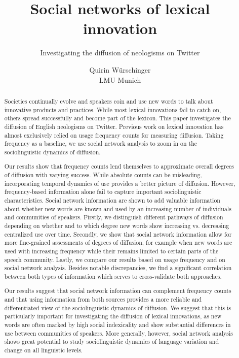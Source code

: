 \documentclass[draft, a4paper, abstract=on]{scrartcl}
\begin{document}

  \title{Social networks of lexical innovation}
  \subtitle{Investigating the diffusion of neologisms on Twitter}
  \author{Quirin Würschinger\\ LMU Munich}
  \maketitle


  \cleardoublepage

  \begin{abstract}

    Societies continually evolve and speakers coin and use new words to talk about innovative products and practices. While most lexical innovations fail to catch on, others spread successfully and become part of the lexicon. This paper investigates the diffusion of English neologisms on Twitter. Previous work on lexical innovation has almost exclusively relied on usage frequency counts for measuring diffusion. Taking frequency as a baseline, we use social network analysis to zoom in on the sociolinguistic dynamics of diffusion.

    Our results show that frequency counts lend themselves to approximate overall degrees of diffusion with varying success. While absolute counts can be misleading, incorporating temporal dynamics of use provides a better picture of diffusion. However, frequency-based information alone fail to capture important sociolinguistic characteristics. Social network information are shown to add valuable information about whether new words are known and used by an increasing number of individuals and communities of speakers. Firstly, we distinguish different pathways of diffusion depending on whether and to which degree new words show increasing vs. decreasing centralized use over time. Secondly, we show that social network information allow for more fine-grained assessments of degrees of diffusion, for example when new words are used with increasing frequency while their remains limited to certain parts of the speech community. Lastly, we compare our results based on usage frequency and on social network analysis. Besides notable discrepancies, we find a significant correlation between both types of information which serves to cross-validate both approaches.

    Our results suggest that social network information can complement frequency counts and that using information from both sources provides a more reliable and differentiated view of the sociolinguistic dynamics of diffusion. We suggest that this is particularly important for investigating the diffusion of lexical innovations, as new words are often marked by high social indexicality and show substantial differences in use between communities of speakers. More generally, however, social network analysis shows great potential to study sociolinguistic dynamics of language variation and change on all linguistic levels.



\end{abstract}
\end{document}
